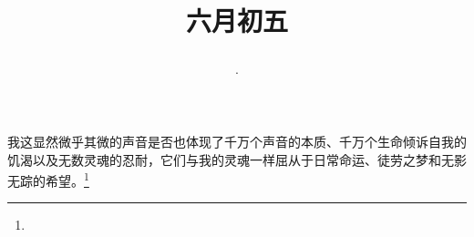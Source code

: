 \title{\date[d=10,m=7,y=2024][year:cn-y,年,month:cn,day:cn,日,·,weekday]·六月初五 }
我这显然微乎其微的声音是否也体现了千万个声音的本质、千万个生命倾诉自我的饥渴以及无数灵魂的忍耐，它们与我的灵魂一样屈从于日常命运、徒劳之梦和无影无踪的希望。\footnote{ }

